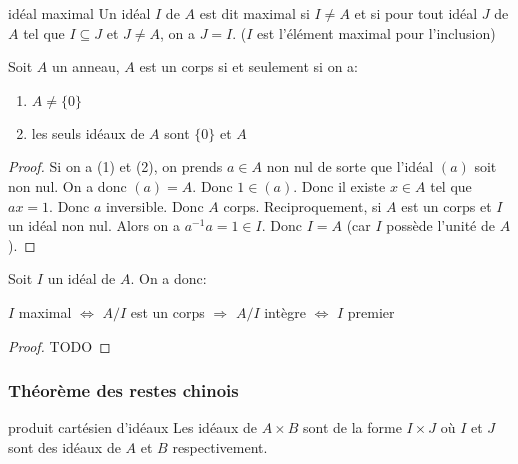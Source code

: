 \begin{definition}{idéal maximal}{}
    Un idéal $I$ de $A$ est dit maximal si $I \neq A$ et si pour tout idéal $J$ de $A$ tel que $I \subseteq J$ et $J \neq A$, on a $J = I$.
    ($I$ est l'élément maximal pour l'inclusion)
\end{definition}

\begin{lemma}{}{}
    Soit $A$ un anneau, $A$ est un corps si et seulement si on a:
    \begin{enumerate}[(1)]
        \item $A \neq \{0\}$
        \item les seuls idéaux de $A$ sont $\{0\}$ et $A$
    \end{enumerate}
\end{lemma}

\begin{proof}
    Si on a (1) et (2), on prends $a \in A$ non nul de sorte que l'idéal $(a)$
    soit non nul. On a donc $(a) = A$. Donc $1 \in (a)$. Donc il existe $x \in A$
    tel que $ax = 1$. Donc $a$ inversible. Donc $A$ corps. \newline
    Reciproquement, si $A$ est un corps et $I$ un idéal non nul. Alors on a $a^{-1}a = 1 \in I$.
    Donc $I = A$ (car $I$ possède l'unité de $A$).
\end{proof}

\begin{proposition}{}{}
    Soit $I$ un idéal de $A$. On a donc:
    \begin{center}
        $I$ maximal $\Longleftrightarrow$ $A/I$ est un corps $\Longrightarrow$ $A/I$ intègre $\Longleftrightarrow$ $I$ premier
    \end{center}
\end{proposition}

\begin{proof}
    TODO
\end{proof}

\subsubsection{Théorème des restes chinois}

\begin{proposition}{produit cartésien d'idéaux}{}
    Les idéaux de $A \times B$ sont de la forme $I \times J$ 
    où $I$ et $J$ sont des idéaux de $A$ et $B$ respectivement. 
\end{proposition}

